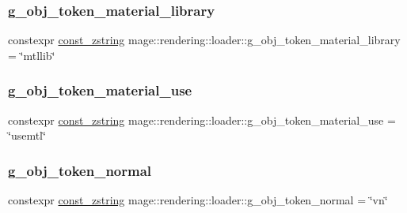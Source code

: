 \hypertarget{namespacemage_1_1rendering_1_1loader_adeb966ab9cb13f0665a23d31d34fc85b}{}\label{namespacemage_1_1rendering_1_1loader_adeb966ab9cb13f0665a23d31d34fc85b} 
\subsubsection{\texorpdfstring{g\+\_\+obj\+\_\+token\+\_\+material\+\_\+library}{g\_obj\_token\_material\_library}}
{\footnotesize\ttfamily constexpr \hyperlink{namespacemage_abfd9206dc607ceb5d13ec68bf075a5c0}{const\+\_\+zstring} mage\+::rendering\+::loader\+::g\+\_\+obj\+\_\+token\+\_\+material\+\_\+library = \char`\"{}mtllib\char`\"{}}

\hypertarget{namespacemage_1_1rendering_1_1loader_aca66c986fe0debd4ea787ff4464fbb72}{}\label{namespacemage_1_1rendering_1_1loader_aca66c986fe0debd4ea787ff4464fbb72} 
\subsubsection{\texorpdfstring{g\+\_\+obj\+\_\+token\+\_\+material\+\_\+use}{g\_obj\_token\_material\_use}}
{\footnotesize\ttfamily constexpr \hyperlink{namespacemage_abfd9206dc607ceb5d13ec68bf075a5c0}{const\+\_\+zstring} mage\+::rendering\+::loader\+::g\+\_\+obj\+\_\+token\+\_\+material\+\_\+use = \char`\"{}usemtl\char`\"{}}

\hypertarget{namespacemage_1_1rendering_1_1loader_a1ccd473a1d57fa2581197b20131a7e98}{}\label{namespacemage_1_1rendering_1_1loader_a1ccd473a1d57fa2581197b20131a7e98} 
\subsubsection{\texorpdfstring{g\+\_\+obj\+\_\+token\+\_\+normal}{g\_obj\_token\_normal}}
{\footnotesize\ttfamily constexpr \hyperlink{namespacemage_abfd9206dc607ceb5d13ec68bf075a5c0}{const\+\_\+zstring} mage\+::rendering\+::loader\+::g\+\_\+obj\+\_\+token\+\_\+normal = \char`\"{}vn\char`\"{}}

